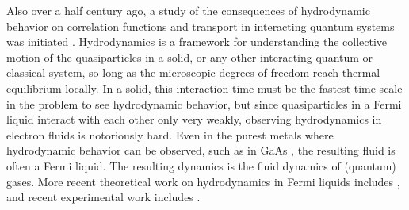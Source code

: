 Also over a half century ago,  a study of the consequences of hydrodynamic behavior on correlation functions and transport in interacting quantum systems was initiated \cite{kadanoff_hydrodynamic_1963}.    Hydrodynamics is a framework for understanding the collective motion of the quasiparticles in a solid, or any other interacting quantum or classical system, so long as the microscopic degrees of freedom reach thermal equilibrium locally.   In a solid, this interaction time must be the fastest time scale in the problem to see hydrodynamic behavior, but since quasiparticles in a Fermi liquid interact with each other only very weakly, observing hydrodynamics in electron fluids is notoriously hard.  Even in the purest metals where hydrodynamic behavior can be observed, such as in GaAs \cite{jong_hydrodynamic_1995, weber_observation_2005, yang_doppler_2012},  the resulting fluid is often a Fermi liquid.  The resulting dynamics is the fluid dynamics of (quantum) gases.  More recent theoretical work on hydrodynamics in Fermi liquids 
includes \cite{andreev_hydrodynamic_2011, mendoza_preturbulent_2011, tomadin_corbino_2014, principi_violation_2015, torre_nonlocal_2015, levitov_electron_2016}, and recent experimental work includes \cite{bandurin_negative_2016, moll_evidence_2016}.

